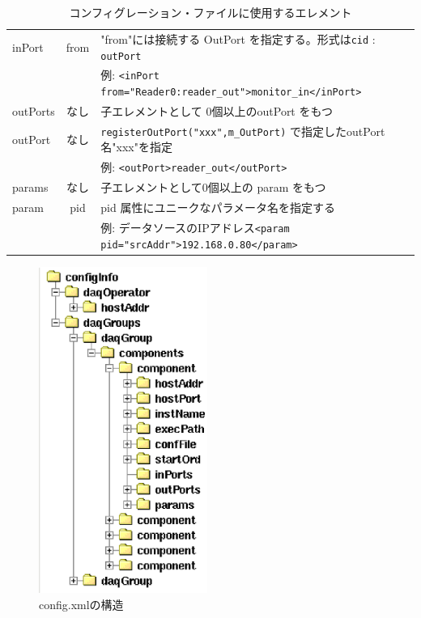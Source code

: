 \documentclass[a4j,10pt,dvips,onecolumn,oneside,final]{jarticle}%
\begin{document}
\begin{table}[htbp]
\begin{center}
{\begin{tabular}{|l|c|l|}
      inPort      &  from & "from"には接続する OutPort を指定する。形式は\verb|cid| : \verb|outPort|\\
                  &       & 例: \verb|<inPort from="Reader0:reader_out">monitor_in</inPort>|\\ \hline
      outPorts    &  なし & 子エレメントとして 0個以上のoutPort をもつ\\ \hline
      outPort     &  なし & \verb|registerOutPort("xxx",m_OutPort)| で指定したoutPort名"xxx"を指定\\
                  &       & 例: \verb|<outPort>reader_out</outPort>|\\ \hline
      params      &  なし & 子エレメントとして0個以上の param をもつ\\ \hline
      param       &  pid  & pid 属性にユニークなパラメータ名を指定する\\
                  &       & 例: データソースのIPアドレス\verb|<param pid="srcAddr">192.168.0.80</param>|\\ \hline
    \end{tabular}
    \caption{コンフィグレーション・ファイルに使用するエレメント}
    \label{tag.tab}
}
\end{center}
\end{table}

\begin{figure}
\vspace{-6mm}
  \begin{center}
   \includegraphics[width=55mm]{config-tree.eps}
  \end{center}
  \caption{\footnotesize config.xmlの構造}
  \label{config-tree.fig}
\end{figure}
\end{document}
